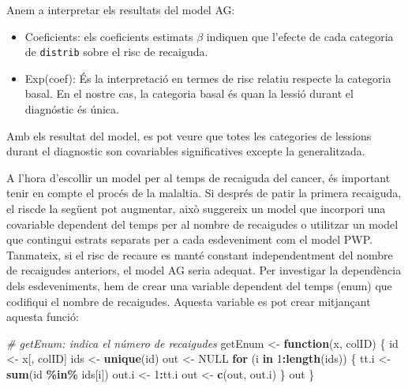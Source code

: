 \documentclass[
]{article}
\newenvironment{Shaded}{\begin{snugshade}}{\end{snugshade}}
\newcommand{\CommentTok}[1]{\textcolor[rgb]{0.56,0.35,0.01}{\textit{#1}}}
\newcommand{\ConstantTok}[1]{\textcolor[rgb]{0.56,0.35,0.01}{#1}}
\newcommand{\ControlFlowTok}[1]{\textcolor[rgb]{0.13,0.29,0.53}{\textbf{#1}}}
\newcommand{\DecValTok}[1]{\textcolor[rgb]{0.00,0.00,0.81}{#1}}
\newcommand{\FunctionTok}[1]{\textcolor[rgb]{0.13,0.29,0.53}{\textbf{#1}}}
\newcommand{\NormalTok}[1]{#1}
\newcommand{\OtherTok}[1]{\textcolor[rgb]{0.56,0.35,0.01}{#1}}
\newcommand{\SpecialCharTok}[1]{\textcolor[rgb]{0.81,0.36,0.00}{\textbf{#1}}}
\begin{document}
Anem a interpretar els resultats del model AG:

\begin{itemize}
\item
  Coeficients: els coeficients estimats \(\beta\) indiquen que l'efecte
  de cada categoria de \texttt{distrib} sobre el risc de recaiguda.
\item
  Exp(coef): És la interpretació en termes de risc relatiu respecte la
  categoria basal. En el nostre cas, la categoria basal és quan la
  lessió durant el diagnóstic és única.
\end{itemize}

Amb els resultat del model, es pot veure que totes les categories de
lessions durant el diagnostic son covariables significatives excepte la
generalitzada.

A l'hora d'escollir un model per al temps de recaiguda del cancer, és
important tenir en compte el procés de la malaltia. Si després de patir
la primera recaiguda, el riscde la següent pot augmentar, això suggereix
un model que incorpori una covariable dependent del temps per al nombre
de recaigudes o utilitzar un model que contingui estrats separats per a
cada esdeveniment com el model PWP. Tanmateix, si el risc de recaure es
manté constant independentment del nombre de recaigudes anteriors, el
model AG seria adequat. Per investigar la dependència dels
esdeveniments, hem de crear una variable dependent del temps (enum) que
codifiqui el nombre de recaigudes. Aquesta variable es pot crear
mitjançant aquesta funció:

\begin{Shaded}
\begin{Highlighting}[]
\CommentTok{\# getEnum: indica el número de recaigudes}
\NormalTok{getEnum }\OtherTok{\textless{}{-}} \ControlFlowTok{function}\NormalTok{(x, colID) \{}
\NormalTok{  id }\OtherTok{\textless{}{-}}\NormalTok{ x[, colID]}
\NormalTok{  ids }\OtherTok{\textless{}{-}} \FunctionTok{unique}\NormalTok{(id)}
\NormalTok{  out }\OtherTok{\textless{}{-}} \ConstantTok{NULL}
  \ControlFlowTok{for}\NormalTok{ (i }\ControlFlowTok{in} \DecValTok{1}\SpecialCharTok{:}\FunctionTok{length}\NormalTok{(ids)) \{}
\NormalTok{    tt.i }\OtherTok{\textless{}{-}} \FunctionTok{sum}\NormalTok{(id }\SpecialCharTok{\%in\%}\NormalTok{ ids[i])}
\NormalTok{    out.i }\OtherTok{\textless{}{-}} \DecValTok{1}\SpecialCharTok{:}\NormalTok{tt.i}
\NormalTok{    out }\OtherTok{\textless{}{-}} \FunctionTok{c}\NormalTok{(out, out.i)}
\NormalTok{  \}}
\NormalTok{  out}
\NormalTok{\}}
\end{Highlighting}
\end{Shaded}
\end{document}
